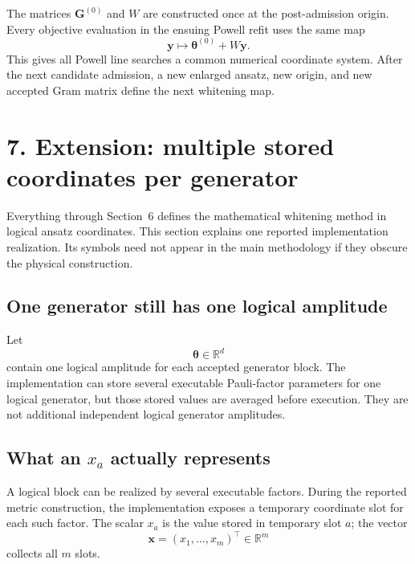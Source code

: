 \documentclass[11pt]{article}
\newcommand{\R}{\mathbb R}
\begin{document}
The matrices \(\mathbf G^{(0)}\) and \(W\) are constructed once at the
post-admission origin.  Every objective evaluation in the ensuing Powell
refit uses the same map
\begin{equation}
\mathbf y
\longmapsto
\boldsymbol\theta^{(0)}+W\mathbf y.
\label{eq:fixed-chart-map}
\end{equation}
This gives all Powell line searches a common numerical coordinate system.
After the next candidate admission, a new enlarged ansatz, new origin, and
new accepted Gram matrix define the next whitening map.

\section*{7. Extension: multiple stored coordinates per generator}

Everything through Section~6 defines the mathematical whitening method in
logical ansatz coordinates.  This section explains one reported
implementation realization.  Its symbols need not appear in the main
methodology if they obscure the physical construction.

\subsection*{One generator still has one logical amplitude}

Let
\begin{equation}
\boldsymbol\theta\in\R^d
\end{equation}
contain one logical amplitude for each accepted generator block.  The
implementation can store several executable Pauli-factor parameters for one
logical generator, but those stored values are averaged before execution.
They are not additional independent logical generator amplitudes.

\subsection*{What an \(x_a\) actually represents}

A logical block can be realized by several executable factors.  During the
reported metric construction, the implementation exposes a temporary
coordinate slot for each such factor.  The scalar \(x_a\) is the value stored
in temporary slot \(a\); the vector
\begin{equation}
\mathbf x=(x_1,\ldots,x_m)^\top\in\R^m
\label{eq:x-definition}
\end{equation}
collects all \(m\) slots.
\end{document}
